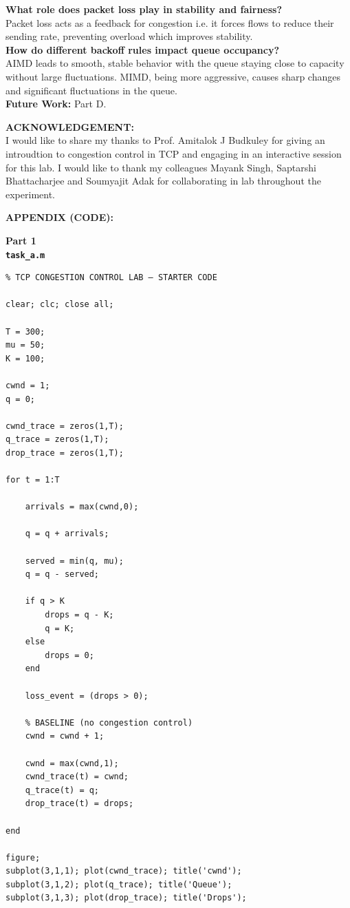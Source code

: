 \documentclass[a4paper,12pt]{article}
\begin{document}
\noindent
\textbf{What role does packet loss play in stability and fairness?}\\
Packet loss acts as a feedback for congestion i.e. it forces flows to reduce their sending rate, preventing overload which improves stability.\\

\textbf{How do different backoff rules impact queue occupancy?}\\
AIMD leads to smooth, stable behavior with the queue staying close to capacity without large fluctuations. MIMD, being more aggressive, causes sharp changes and significant fluctuations in the queue.\\

\noindent
\textbf{Future Work: } Part D.

\noindent
\textbf{ACKNOWLEDGEMENT: }\\
I would like to share my thanks to Prof. Amitalok J Budkuley for giving an introudtion to congestion control in TCP and engaging in an interactive session for this lab. I would like to thank my colleagues Mayank Singh, Saptarshi Bhattacharjee and Soumyajit Adak for collaborating in lab throughout the experiment.\\

\noindent
\printbibliography

\noindent
\textbf{APPENDIX (CODE): }\\
\appendix
\noindent

\noindent
\textbf{Part 1}\\
\textbf{\texttt{task\_a.m}}
\begin{lstlisting}
% TCP CONGESTION CONTROL LAB – STARTER CODE

clear; clc; close all;

T = 300;
mu = 50;
K = 100;

cwnd = 1;
q = 0;

cwnd_trace = zeros(1,T);
q_trace = zeros(1,T);
drop_trace = zeros(1,T);

for t = 1:T

    arrivals = max(cwnd,0);

    q = q + arrivals;

    served = min(q, mu);
    q = q - served;

    if q > K
        drops = q - K;
        q = K;
    else
        drops = 0;
    end

    loss_event = (drops > 0);

    % BASELINE (no congestion control)
    cwnd = cwnd + 1;

    cwnd = max(cwnd,1);
    cwnd_trace(t) = cwnd;
    q_trace(t) = q;
    drop_trace(t) = drops;

end

figure;
subplot(3,1,1); plot(cwnd_trace); title('cwnd');
subplot(3,1,2); plot(q_trace); title('Queue');
subplot(3,1,3); plot(drop_trace); title('Drops');
\end{lstlisting}
\end{document}
